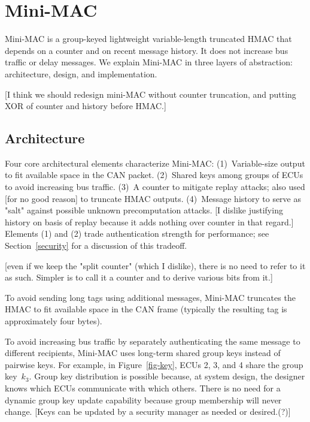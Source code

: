 \section{Mini-MAC}
\label{mini-mac}

Mini-MAC is a group-keyed lightweight variable-length truncated HMAC that
depends on a counter and on recent message history.  It does not increase
bus traffic or delay messages.  We explain Mini-MAC in three layers
of abstraction: architecture, design, and  implementation.

[I think we should redesign mini-MAC without counter truncation,
and putting XOR of counter and history before HMAC.]

\subsection{Architecture}
\label{arch}

Four core architectural elements characterize Mini-MAC:
(1)~Variable-size output to fit available space in the CAN packet.
(2)~Shared keys among groups of ECUs to avoid increasing bus traffic.
(3)~A counter to mitigate replay attacks;  also used [for no good reason]
to truncate HMAC outputs.
(4)~Message history to serve as "salt" against possible unknown precomputation attacks. 
[I dislike justifying history on basis of replay because it adds nothing over counter
in that regard.]
Elements (1) and (2) trade authentication strength for performance;  see
Section~\ref{security} for a discussion of this tradeoff.

[even if we keep the "split counter" (which I dislike), there is no need to 
refer to it as such. Simpler is to call it a counter and to derive various
bits from it.]

To avoid sending long tags using additional messages, Mini-MAC truncates the
HMAC to fit available space in the CAN frame (typically the resulting tag is
approximately four bytes).  

To avoid increasing bus traffic by separately authenticating the same message to different recipients, 
Mini-MAC uses long-term shared group keys instead of pairwise keys.  For example, in Figure~\ref{fig-key}, ECUs
2, 3, and 4 share the group key~$k_3$.
Group key distribution is possible because, at system design, the designer knows which ECUs communicate with which others. 
There is no need for a dynamic group key update capability because group membership will never change.
[Keys can be updated by a security manager as needed or desired.(?)]


